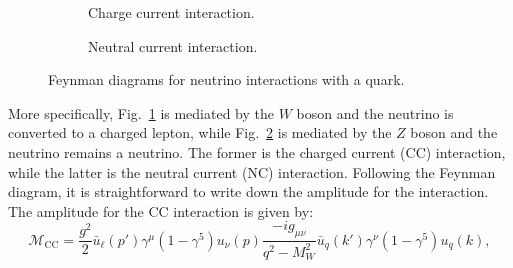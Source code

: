 \begin{figure}[h]
  \centering
  \begin{subfigure}[b]{0.45\textwidth}
    \centering
    \caption{Charge current interaction.}
    \label{fig:cc-interaction}
  \end{subfigure}
  \hfill
  \begin{subfigure}[b]{0.45\textwidth}
    \centering
    \caption{Neutral current interaction.}
    \label{fig:nc-interaction}
  \end{subfigure}
  \caption{Feynman diagrams for neutrino interactions with a quark.}
  \label{fig:nu-q-feyn}
\end{figure}
More specifically, Fig.~\ref{fig:cc-interaction} is mediated by the $W$ boson and the neutrino is converted to a charged lepton, while Fig.~\ref{fig:nc-interaction} is mediated by the $Z$ boson and the neutrino remains a neutrino.
The former is the charged current (CC) interaction, while the latter is the neutral current (NC) interaction.
Following the Feynman diagram, it is straightforward to write down the amplitude for the interaction.
The amplitude for the CC interaction is given by:
\begin{equation}
  \mathcal{M}_{\text{CC}} = \frac{g^2}{2} \bar{u}_\ell(p') \gamma^\mu (1 - \gamma^5) u_\nu(p) \frac{-i g_{\mu\nu}}{q^2 - M_W^2} \bar{u}_q(k') \gamma^\nu (1 - \gamma^5) u_q(k),
\end{equation}
